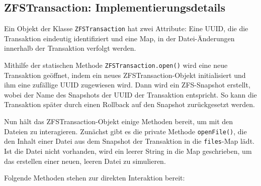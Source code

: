 \documentclass[12pt]{article}
\begin{document}
\subsection*{ZFSTransaction: Implementierungsdetails}
Ein Objekt der Klasse \texttt{ZFSTransaction} hat zwei Attribute: Eine UUID, die die Transaktion eindeutig identifiziert und eine Map, in der Datei-Änderungen innerhalb der Transaktion verfolgt werden.

Mithilfe der statischen Methode \texttt{ZFSTransaction.open()} wird eine neue Transaktion geöffnet, indem ein neues ZFSTransaction-Objekt initialisiert und ihm eine zufällige UUID zugewiesen wird.
Dann wird ein ZFS-Snapshot erstellt, wobei der Name des Snapshots der UUID der Transaktion entspricht.
So kann die Transaktion später durch einen Rollback auf den Snapshot zurückgesetzt werden.

Nun hält das ZFSTransaction-Objekt einige Methoden bereit, um mit den Dateien zu interagieren.
Zunächst gibt es die private Methode \texttt{openFile()}, die den Inhalt einer Datei aus dem Snapshot der Transaktion in die \texttt{files}-Map lädt.
Ist die Datei nicht vorhanden, wird ein leerer String in die Map geschrieben, um das erstellen einer neuen, leeren Datei zu simulieren.

Folgende Methoden stehen zur direkten Interaktion bereit:
\end{document}

